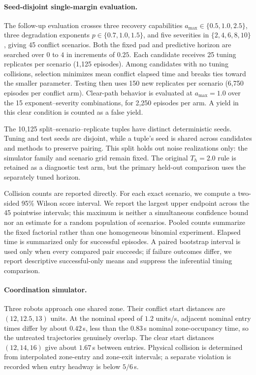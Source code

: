 \paragraph{Seed-disjoint single-margin evaluation.}
The follow-up evaluation crosses three recovery capabilities $a_{\max}\in\{0.5,1.0,2.5\}$, three degradation exponents $p\in\{0.7,1.0,1.5\}$, and five severities in $\{2,4,6,8,10\}$, giving 45 conflict scenarios. Both the fixed pad and predictive horizon are searched over $0$ to $4$ in increments of $0.25$. Each candidate receives 25 tuning replicates per scenario (1,125 episodes). Among candidates with no tuning collisions, selection minimizes mean conflict elapsed time and breaks ties toward the smaller parameter. Testing then uses 150 new replicates per scenario (6,750 episodes per conflict arm). Clear-path behavior is evaluated at $a_{\max}=1.0$ over the 15 exponent--severity combinations, for 2,250 episodes per arm. A yield in this clear condition is counted as a false yield.

The 10,125 split--scenario--replicate tuples have distinct deterministic seeds. Tuning and test seeds are disjoint, while a tuple's seed is shared across candidates and methods to preserve pairing. This split holds out noise realizations only: the simulator family and scenario grid remain fixed. The original $T_h=2.0$ rule is retained as a diagnostic test arm, but the primary held-out comparison uses the separately tuned horizon.

Collision counts are reported directly. For each exact scenario, we compute a two-sided 95\% Wilson score interval. We report the largest upper endpoint across the 45 pointwise intervals; this maximum is neither a simultaneous confidence bound nor an estimate for a random population of scenarios. Pooled counts summarize the fixed factorial rather than one homogeneous binomial experiment. Elapsed time is summarized only for successful episodes. A paired bootstrap interval is used only when every compared pair succeeds; if failure outcomes differ, we report descriptive successful-only means and suppress the inferential timing comparison.

\paragraph{Coordination simulator.}
Three robots approach one shared zone. Their conflict start distances are $(12,12.5,13)$ units. At the nominal speed of $1.2$ units/s, adjacent nominal entry times differ by about $0.42$\,s, less than the $0.83$\,s nominal zone-occupancy time, so the untreated trajectories genuinely overlap. The clear start distances $(12,14,16)$ give about $1.67$\,s between entries. Physical collision is determined from interpolated zone-entry and zone-exit intervals; a separate violation is recorded when entry headway is below $5/6$\,s.

